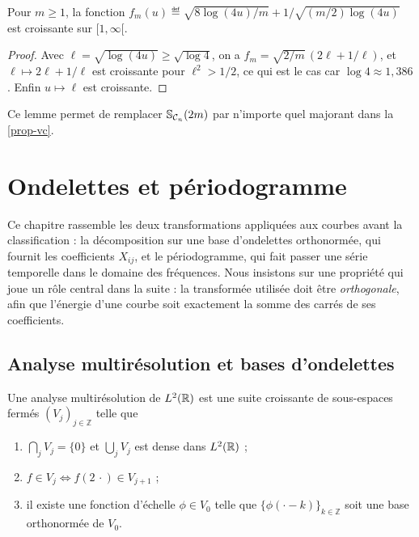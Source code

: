 \begin{lemme}\label{lem-monotonie}
Pour $m\ge1$, la fonction $f_m(u)\eqdef\sqrt{8\log(4u)/m}+1/\sqrt{(m/2)\log(4u)}$ est croissante sur $[1,\infty[$.
\end{lemme}

\begin{proof}
Avec $\ell=\sqrt{\log(4u)}\ge\sqrt{\log4}$, on a $f_m=\sqrt{2/m}\,(2\ell+1/\ell)$, et $\ell\mapsto2\ell+1/\ell$ est croissante pour $\ell^2>1/2$, ce qui est le cas car $\log4\approx1{,}386$. Enfin $u\mapsto\ell$ est croissante.
\end{proof}

Ce lemme permet de remplacer $\mathbb{S}_{\mathcal{C}_n}(2m)$ par n'importe quel majorant dans la \cref{prop-vc}.

\chapter{Ondelettes et périodogramme}\label{chap-ondelettes}

Ce chapitre rassemble les deux transformations appliquées aux courbes avant la classification : la décomposition sur une base d'ondelettes orthonormée, qui fournit les coefficients $X_{ij}$, et le périodogramme, qui fait passer une série temporelle dans le domaine des fréquences. Nous insistons sur une propriété qui joue un rôle central dans la suite : la transformée utilisée doit être \emph{orthogonale}, afin que l'énergie d'une courbe soit exactement la somme des carrés de ses coefficients.

\section{Analyse multirésolution et bases d'ondelettes}\label{sec-amr}

\begin{definition}
Une analyse multirésolution de $L^2(\mathbb{R})$ est une suite croissante de sous-espaces fermés $(V_j)_{j\in\mathbb{Z}}$ telle que
\begin{enumerate}[label=(\roman*)]
  \item $\bigcap_j V_j=\{0\}$ et $\bigcup_j V_j$ est dense dans $L^2(\mathbb{R})$ ;
  \item $f\in V_j\iff f(2\,\cdot)\in V_{j+1}$ ;
  \item il existe une fonction d'échelle $\phi\in V_0$ telle que $\{\phi(\cdot-k)\}_{k\in\mathbb{Z}}$ soit une base orthonormée de $V_0$.
\end{enumerate}
\end{definition}

